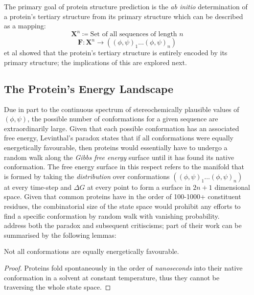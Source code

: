  The primary goal of protein structure prediction
 is the \emph{ab initio} determination of a protein's
 tertiary structure from its primary structure \cite{Yang}
 which can be described as a mapping:
 \begin{equation}
    \mathbf{X}^n \coloneqq \text{Set of all sequences of length $n$}
 \end{equation}
 \begin{equation}
    \mathbf{F}:\mathbf{X}^n \rightarrow ((\phi,\psi)_1 \ldots (\phi,\psi)_n)
 \end{equation}
 \cite{Anfinsen} et al showed that the protein's
 tertiary structure is entirely encoded by 
 its primary structure; the implications of this are explored next.

\subsection{The Protein's Energy Landscape}
Due in part to the continuous spectrum of stereochemically 
plausible values of $(\phi, \psi)$, the possible number of conformations
for a given sequence are extraordinarily large. 
Given that each possible conformation has an associated free energy,
Levinthal's paradox states that if all conformations were equally
energetically favourable, then proteins would essentially have to undergo
a random walk along the \emph{Gibbs free energy} surface until it has found its native conformation.
The free energy surface in this respect refers to the manifold that is formed
by taking the \emph{distribution} over conformations $((\phi, \psi)_1\ldots(\phi,\psi)_n)$ at every time-step
and $\Delta G$ at every point to form a surface in $2n+1$ dimensional space.
Given that common proteins have in the order of 100-1000+ constituent residues,
the combinatorial size of the state space would prohibit any efforts to find 
a specific conformation by random walk with vanishing probability. \\
\cite{Yang} address both the paradox and subsequent critiscisms;
part of their work can be summarised by the following lemmas:
\begin{lemma}
    Not all conformations are equally energetically favourable.
\end{lemma}
\begin{proof}
    Proteins fold spontaneously in the order of \emph{nanoseconds} into their native
    conformation in a solvent at constant temperature, thus they cannot
    be traversing the whole state space.
\end{proof}
